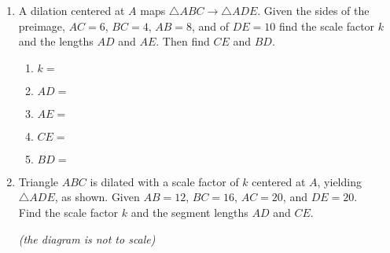\documentclass[12pt, twoside]{article}
\begin{document}
\begin{enumerate}
\newpage
  \item A dilation centered at $A$ maps $\triangle ABC \rightarrow \triangle ADE$. Given the sides of the preimage, $AC = 6$, $BC = 4$, $AB = 8$, and of $DE = 10$ find the scale factor $k$ and the lengths $AD$ and $AE$. Then find $CE$ and $BD$. 
  \begin{multicols}{2}
    \begin{enumerate}
      \item $k=$ \vspace{0.3cm}
      \item $AD=$ \vspace{0.3cm}
      \item $AE=$ \vspace{0.3cm}
      \item $CE=$
      \item $BD=$
    \end{enumerate}
  \begin{flushright}
  \end{flushright} 
\end{multicols}\vspace{1.5cm}
  
  \item Triangle $ABC$ is dilated with a scale factor of $k$ centered at $A$, yielding $\triangle ADE$, as shown. Given $AB=12$, $BC=16$, $AC=20$, and $DE=20$. \\[0.25cm] Find the scale factor $k$ and the segment lengths $AD$ and $CE$.
  \begin{flushright} \emph{(the diagram is not to scale)} \end{flushright}
    \begin{flushright}
    \end{flushright} \vspace{2.5cm}


\end{enumerate}
\end{document}
